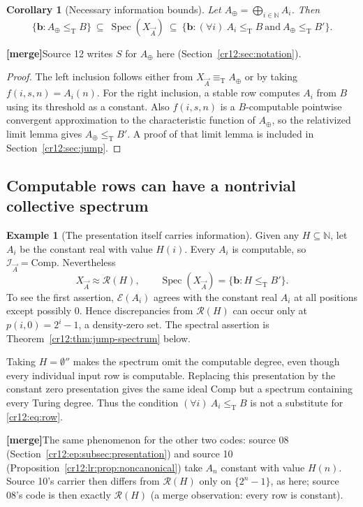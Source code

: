 \documentclass[11pt,letterpaper]{article}
\theoremstyle{plain}
\newtheorem{corollary}[theorem]{Corollary}
\theoremstyle{definition}
\newtheorem{example}[theorem]{Example}
\theoremstyle{remark}
\numberwithin{equation}{section}
\newcommand{\N}{\mathbb N}
\newcommand{\leT}{\leq_{\mathrm T}}
\newcommand{\eqT}{\equiv_{\mathrm T}}
\newcommand{\Spec}{\operatorname{Spec}}
\newcommand{\Comp}{\mathrm{Comp}}
\newcommand{\Rcode}{\mathcal R}
\newcommand{\Ecode}{\mathcal E}
\newcommand{\I}{\mathcal I}
\newcommand{\joinvec}{\bigoplus_{i\in\N}}
\newcommand{\mergenote}[1]{\par\smallskip\noindent
 {\small\textsf{\textbf{[merge]}}\enspace #1}\par\smallskip}
\newcommand{\Aplus}{A_{\oplus}}          %
\begin{document}
\begin{corollary}[Necessary information bounds]\label{cr12:cor:rowbounds}
Let $\Aplus=\joinvec A_i$. Then
\begin{equation}\label{cr12:eq:sandwich}
 \{\mathbf b:\Aplus\leT B\}
 \ \subseteq\ \Spec(X_{\vec A})
 \ \subseteq\
 \{\mathbf b:(\forall i)\ A_i\leT B\ \text{and}\ \Aplus\leT B'\}.
\end{equation}
\end{corollary}
\mergenote{Source 12 writes $S$ for $\Aplus$ here (Section~\ref{cr12:sec:notation}).}
\begin{proof}
The left inclusion follows either from $X_{\vec A}\eqT \Aplus$ or by taking
$f(i,s,n)=A_i(n)$. For the right inclusion, a stable row computes $A_i$ from
$B$ using its threshold as a constant. Also $f(i,s,n)$ is a $B$-computable
pointwise convergent approximation to the characteristic function of $\Aplus$,
so the relativized limit lemma gives $\Aplus\leT B'$. A proof of that limit lemma
is included in Section~\ref{cr12:sec:jump}.
\end{proof}

\subsection{Computable rows can have a nontrivial collective spectrum}
\begin{example}[The presentation itself carries information]\label{cr12:ex:constantrows}
Given any $H\subseteq\N$, let $A_i$ be the constant real with value $H(i)$.
Every $A_i$ is computable, so $\I_{\vec A}=\Comp$. Nevertheless
\begin{equation}\label{cr12:eq:constantrows}
 X_{\vec A}\approx\Rcode(H),\qquad
 \Spec(X_{\vec A})=\{\mathbf b:H\leT B'\}.
\end{equation}
To see the first assertion, $\Ecode(A_i)$ agrees with the constant real $A_i$
at all positions except possibly $0$. Hence discrepancies from $\Rcode(H)$
can occur only at $p(i,0)=2^i-1$, a density-zero set. The spectral assertion
is Theorem~\ref{cr12:thm:jump-spectrum} below.

Taking $H=\emptyset''$ makes the spectrum omit the computable degree, even
though every individual input row is computable. Replacing this presentation
by the constant zero presentation gives the same ideal $\Comp$ but a spectrum
containing every Turing degree. Thus the condition
$(\forall i)\ A_i\leT B$ is not a substitute for \eqref{cr12:eq:row}.
\end{example}
\mergenote{The same phenomenon for the other two codes: source 08
(Section~\ref{cr12:ep:subsec:presentation}) and source 10
(Proposition~\ref{cr12:lr:prop:noncanonical}) take $A_n$ constant with value $H(n)$.
Source 10's carrier then differs from $\Rcode(H)$ only on $\{2^n-1\}$, as here;
source 08's code is then exactly $\Rcode(H)$ (a merge observation: every row is
constant).}
\end{document}
